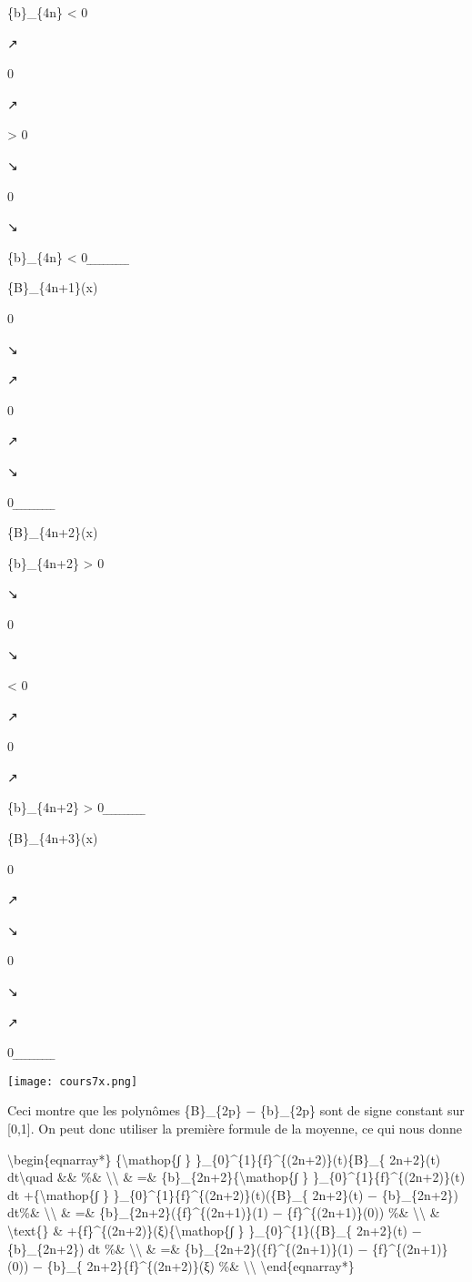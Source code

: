 \documentclass[]{article}
\begin{document}
\{b\}\_\{4n\} \textless{} 0

↗

0

↗

\textgreater{} 0

↘

0

↘

\{b\}\_\{4n\} \textless{} 0 ̲ ̲ ̲ ̲ ̲ ̲ ̲ ̲ ̲ ̲

\{B\}\_\{4n+1\}(x)

0

↘

↗

0

↗

↘

0 ̲ ̲ ̲ ̲ ̲ ̲ ̲ ̲ ̲ ̲

\{B\}\_\{4n+2\}(x)

\{b\}\_\{4n+2\} \textgreater{} 0

↘

0

↘

\textless{} 0

↗

0

↗

\{b\}\_\{4n+2\} \textgreater{} 0 ̲ ̲ ̲ ̲ ̲ ̲ ̲ ̲ ̲ ̲

\{B\}\_\{4n+3\}(x)

0

↗

↘

0

↘

↗

0 ̲ ̲ ̲ ̲ ̲ ̲ ̲ ̲ ̲ ̲

\texttt{[image: cours7x.png]}

Ceci montre que les polynômes \{B\}\_\{2p\} − \{b\}\_\{2p\} sont de
signe constant sur {[}0,1{]}. On peut donc utiliser la première formule
de la moyenne, ce qui nous donne

\textbackslash{}begin\{eqnarray*\} \{\textbackslash{}mathop\{∫ \}
\}\_\{0\}\^{}\{1\}\{f\}\^{}\{(2n+2)\}(t)\{B\}\_\{ 2n+2\}(t)
dt\textbackslash{}quad \&\& \%\& \textbackslash{}\textbackslash{} \& =\&
\{b\}\_\{2n+2\}\{\textbackslash{}mathop\{∫ \}
\}\_\{0\}\^{}\{1\}\{f\}\^{}\{(2n+2)\}(t) dt +\{\textbackslash{}mathop\{∫
\} \}\_\{0\}\^{}\{1\}\{f\}\^{}\{(2n+2)\}(t)(\{B\}\_\{ 2n+2\}(t) −
\{b\}\_\{2n+2\}) dt\%\& \textbackslash{}\textbackslash{} \& =\&
\{b\}\_\{2n+2\}(\{f\}\^{}\{(2n+1)\}(1) − \{f\}\^{}\{(2n+1)\}(0)) \%\&
\textbackslash{}\textbackslash{} \& \textbackslash{}text\{\} \&
+\{f\}\^{}\{(2n+2)\}(ξ)\{\textbackslash{}mathop\{∫ \}
\}\_\{0\}\^{}\{1\}(\{B\}\_\{ 2n+2\}(t) − \{b\}\_\{2n+2\}) dt \%\&
\textbackslash{}\textbackslash{} \& =\&
\{b\}\_\{2n+2\}(\{f\}\^{}\{(2n+1)\}(1) − \{f\}\^{}\{(2n+1)\}(0)) −
\{b\}\_\{ 2n+2\}\{f\}\^{}\{(2n+2)\}(ξ) \%\&
\textbackslash{}\textbackslash{} \textbackslash{}end\{eqnarray*\}
\end{document}
